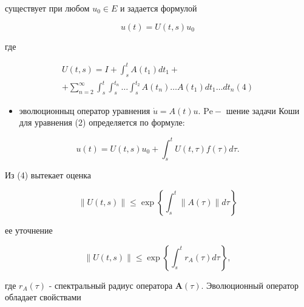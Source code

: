 \documentclass[10pt]{article}
\begin{document}
существует при любом $u_{0} \in E$ и задается формулой



\[

u(t)=U(t, s) u_{0}

\]



где



\[

\begin{gathered}

U(t, s)=I+\int_{s}^{t} A\left(t_{1}\right) d t_{1}+ \\

+\sum_{n=2}^{\infty} \int_{s}^{t} \int_{s}^{t_{n}} \ldots \int_{s}^{t_{2}} A\left(t_{n}\right) \ldots A\left(t_{1}\right) d t_{1} \ldots d t_{n}(4)

\end{gathered}

\]



\begin{itemize}

  \item эволюционныц оператор уравнения $\dot{u}=A(t) u$. $\mathrm{Pe}-$ шение задачи Коши для уравнения (2) определяется по формуле:

\end{itemize}



\[

u(t)=U(t, s) u_{0}+\int_{s}^{t} U(t, \tau) f(\tau) d \tau .

\]



Из (4) вытекает оценка



\[

\|U(t, s)\| \leqslant \exp \left\{\int_{s}^{t}\|A(\tau)\| d \tau\right\}

\]



ее уточнение



\[

\|U(t, s)\| \leqslant \exp \left\{\int_{s}^{t} r_{A}(\tau) d \tau\right\},

\]



где $r_{A}(\tau)$ - спектральный радиус оператора $\boldsymbol{A}(\tau)$. Эволюционный оператор обладает свойствами
\end{document}

